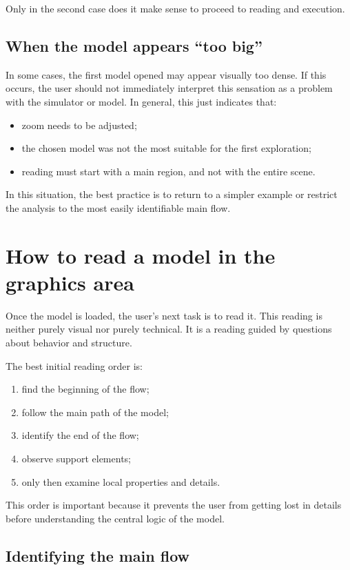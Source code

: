 Only in the second case does it make sense to proceed to reading and execution.

\subsection{When the model appears ``too big''}
\label{subsec:cap4_modelo_grande_demais}

In some cases, the first model opened may appear visually too dense. If this occurs, the user should not immediately interpret this sensation as a problem with the simulator or model. In general, this just indicates that:
\begin{itemize}
\item zoom needs to be adjusted;
\item the chosen model was not the most suitable for the first exploration;
\item reading must start with a main region, and not with the entire scene.
\end{itemize}

In this situation, the best practice is to return to a simpler example or restrict the analysis to the most easily identifiable main flow.

\section{How to read a model in the graphics area}
\label{sec:cap4_como_ler_modelo_area_grafica}

Once the model is loaded, the user's next task is to read it. This reading is neither purely visual nor purely technical. It is a reading guided by questions about behavior and structure.

The best initial reading order is:
\begin{enumerate}
\item find the beginning of the flow;
\item follow the main path of the model;
\item identify the end of the flow;
\item observe support elements;
\item only then examine local properties and details.
\end{enumerate}

This order is important because it prevents the user from getting lost in details before understanding the central logic of the model.

\subsection{Identifying the main flow}
\label{subsec:cap4_identificando_fluxo_principal}

